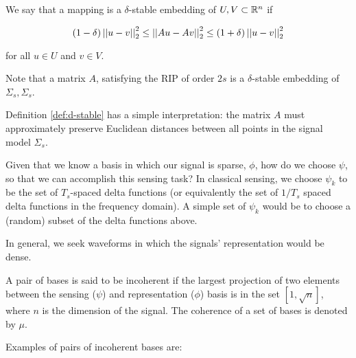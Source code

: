 \begin{definition}
We say that a mapping is a \(\delta\)-stable embedding of \(U,V \subset {\mathbb{R}}^n\) if

\begin{equation}
\left(1 - \delta \right) \left|\left|u-v\right|\right|_2^2 \leq \left|\left|Au-Av\right|\right|_2^2 \leq \left(1 + \delta\right) \left|\left|u-v\right|\right|_2^2
\end{equation}

for all \(u \in U\) and \(v \in V\). 
\label{def:d-stable}
\end{definition} 

\begin{remark}
Note that a matrix \(A\), satisfying the RIP of order \(2s\) is a \(\delta\)-stable embedding of \(\Sigma_s, \Sigma_s\). 
\end{remark}

\begin{remark}
Definition \ref{def:d-stable} has a simple interpretation: the matrix \(A\) must approximately preserve Euclidean distances between all points in the signal model \(\Sigma_s\).
\end{remark}

Given that we know a basis in which our signal is sparse, \(\phi\), how do we choose \(\psi\), so that we can accomplish this sensing task? In classical sensing, we choose \(\psi_k\) to be the set of \( T_s \)-spaced delta functions (or equivalently the set of \( 1/T_s \) spaced delta functions in the frequency domain). A simple set of \(\psi_k\) would be to choose a (random) subset of the delta functions above.

In general, we seek waveforms in which the signals' representation would be dense.

\begin{definition}[Incoherence]
A pair of bases is said to be incoherent if the largest projection of two elements between the sensing (\(\psi\)) and representation (\(\phi\)) basis  is in the set \( [1 , \sqrt{n}] \), where \( n \) is the dimension of the signal. The coherence of a set of bases is denoted by \(\mu\).
\end{definition}
Examples of pairs of incoherent bases are:

